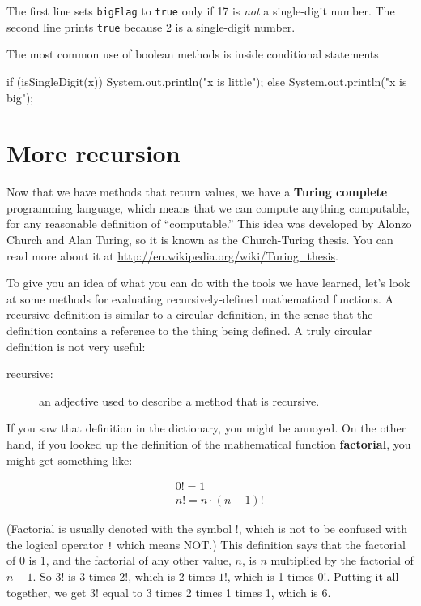 The first line sets {\tt bigFlag} to {\tt true}
only if 17 is {\em not} a single-digit number.  The second
line prints {\tt true} because 2 is a single-digit number.

The most common use of boolean methods is inside conditional
statements

\begin{code}
    if (isSingleDigit(x)) {
      System.out.println("x is little");
    } else {
      System.out.println("x is big");
    }
\end{code}


\section{More recursion}
\label{factorial}

Now that we have methods that return values, we have a {\bf Turing
  complete} programming language, which means that we can compute
anything computable, for any reasonable definition of ``computable.''
%
This idea was developed by Alonzo Church and Alan Turing, so it is
known as the Church-Turing thesis.  You can read more about it at
\url{http://en.wikipedia.org/wiki/Turing_thesis}.

To give you an idea of what you can do with the tools we have learned,
let's look at some methods for evaluating recursively-defined
mathematical functions.  A recursive definition is similar to a
circular definition, in the sense that the definition contains a
reference to the thing being defined.  A truly circular definition is
not very useful:

\begin{description}

\item[recursive:] an adjective used to describe a method that is recursive.

\end{description}

If you saw that definition in the dictionary, you might be
annoyed.  On the other hand, if you looked up the definition
of the mathematical function {\bf factorial}, you might
get something like:

\begin{eqnarray*}
&&  0! = 1 \\
&&  n! = n \cdot(n-1)!
\end{eqnarray*}

(Factorial is usually denoted with the symbol $!$, which is
not to be confused with the logical operator {\tt !} which
means NOT.)  This definition says that the factorial of 0 is 1,
and the factorial of any other value, $n$, is $n$ multiplied
by the factorial of $n-1$.  So $3!$ is 3 times $2!$, which is 2 times
$1!$, which is 1 times $0!$.  Putting it all together, we get
$3!$ equal to 3 times 2 times 1 times 1, which is 6.

